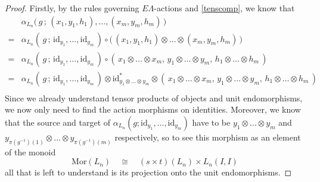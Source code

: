 \documentclass{amsbook} %
\newcommand{\id}{\textrm{id}}
\newcommand{\MorLn}{\mathrm{Mor}(L_n)}
\numberwithin{section}{chapter}
\begin{document}
\begin{proof}
Firstly, by the rules governing $E\Lambda$-actions and \cref{tenscomp}, we know that
\[ \begin{array}{rl} 
			& \alpha_{L_n}\big( \, g \, ; \, (x_1, y_1, h_1), \ldots, (x_m, y_m, h_m) \, \big) \\
			= & \alpha_{L_n}( \, g \, ; \, \id_{y_1}, \ldots, \id_{y_m} \, ) \circ \big( \, (x_1, y_1, h_1) \otimes \ldots \otimes (x_m, y_m, h_m) \, \big) \\
			= & \alpha_{L_n}( \, g \, ; \, \id_{y_1}, \ldots, \id_{y_m} \, ) \circ ( \, x_1 \otimes \ldots \otimes x_m, \, y_1 \otimes \ldots \otimes y_m, \, h_1 \otimes \ldots \otimes h_m \, ) \\
			= & \alpha_{L_n}( \, g \, ; \, \id_{y_1}, \ldots, \id_{y_m} \, ) \otimes \id_{y_1 \otimes \ldots \otimes y_m}^* \otimes ( \, x_1 \otimes \ldots \otimes x_m, \, y_1 \otimes \ldots \otimes y_m, \, h_1 \otimes \ldots \otimes h_m \, ) \\
		\end{array}
\]
Since we already understand tensor products of objects and unit endomorphisms, we now only need to find the action morphisms on identities. Moreover, we know that the source and target of $\alpha_{L_n}(g; \id_{y_1}, \ldots, \id_{y_m})$ have to be $y_1 \otimes \ldots \otimes y_m$ and $y_{\pi(g^{-1})(1)} \otimes \ldots \otimes y_{\pi(g^{-1})(m)}$ respectively, so to see this morphism as an element of the monoid
\[ \MorLn \quad \cong \quad (s \times t)(L_n) \times L_n(I,I) \]
all that is left to understand is its projection onto the unit endomorphisms.


\end{proof}
\end{document}
